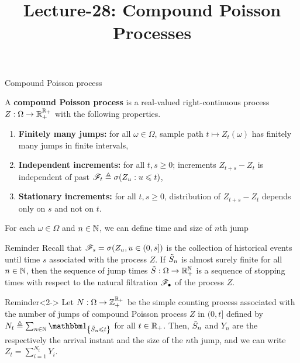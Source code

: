 \documentclass[12pt,aspectratio=169]{beamer}
\title{Lecture-28: Compound Poisson Processes}
\date{}
\begin{document}
\pagestyle{empty}
\maketitle

\begin{frame}{Compound Poisson process}
\begin{Definition}
A \textbf{compound Poisson process} is a real-valued right-continuous process $Z:\Omega\to\mathbb{R}_+^{\mathbb{R}_+}$ with the following properties.
\begin{enumerate}[i\_]
	\item<2-> \textbf{Finitely many jumps:} for all $\omega \in \Omega$, sample path $t \mapsto Z_t(\omega)$ has finitely many jumps in finite intervals,
	\item<3-> \textbf{Independent increments:} for all $t,s \ge 0$; increments $Z_{t+s}-Z_t$ is independent of past $\mathscr{F}_t \triangleq \sigma(Z_u: u\leqslant t)$, 
	\item<4-> \textbf{Stationary increments:} for all $t,s \ge 0$, distribution of $Z_{t+s}-Z_t$ depends only on $s$ and not on $t$.
\end{enumerate}	
\end{Definition}
\end{frame}

\begin{frame}
\begin{Definition}
For each $\omega \in \Omega$ and $n \in \mathbb{N}$, we can define time and size of $n$th jump
\end{Definition}
\end{frame}

\begin{frame}
\begin{block}{Reminder}
Recall that $\mathscr{F}_s = \sigma(Z_u, u \in (0, s])$ is the collection of historical events until time $s$ 
associated with the process $Z$. 
If $\tilde{S}_n$ is almost surely finite for all $n \in \mathbb{N}$, 
then the sequence of jump times $\tilde{S}:\Omega\to\mathbb{R}_+^{\mathbb{N}}$ is a sequence of stopping times with respect to the natural filtration $\mathscr{F}_\bullet$ of the process $Z$. 
\end{block}

\begin{block}{Reminder}<2->
Let $N:\Omega\to\mathbb{Z}_+^{\mathbb{R}_+}$ be the simple counting process associated with the number of jumps of compound Poisson process $Z$ in $(0,t]$ defined by $N_t \triangleq \sum_{n\in\N}\SetIn{\tS_n\le t}$ for all $t\in\mathbb{R}_+$. 
Then, $\tilde{S}_n$ and  $Y_n$ are the respectively the arrival instant and the size of the $n$th jump, 
and we can write $Z_t = \sum_{i = 1}^{N_t}Y_i$. 
\end{block}
\end{frame}
\end{document}
